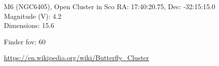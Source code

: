 \begin{block}{M6 (NGC6405), Open Cluster in Sco}
    RA: 17:40:20.75, Dec: -32:15:15.0 \\ 
    Magnitude (V): 4.2 \\ 
    Dimensions: 15.6 

    Finder fov: 60 

    \url{https://en.wikipedia.org/wiki/Butterfly_Cluster} 
\end{block}